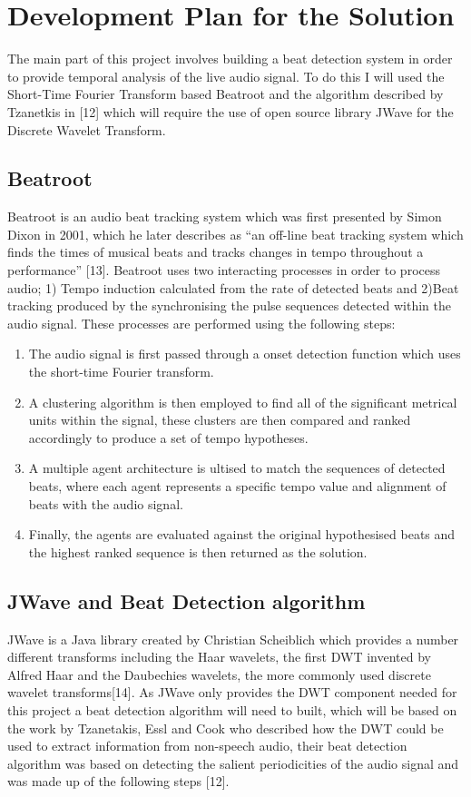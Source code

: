\documentclass[a4paper, 11pt]{article}
\begin{document}
\section{Development Plan for the Solution}

The main part of this project involves building a beat detection system in order to provide temporal analysis of the live audio signal. To do this I will used the Short-Time Fourier Transform based Beatroot and the algorithm described by Tzanetkis in [12] which will require the use of open source library JWave for the Discrete Wavelet Transform. 

\subsection{Beatroot}
Beatroot is an audio beat tracking system which was first presented by Simon Dixon in 2001, which he later describes as ``an off-line beat tracking system which finds the times of musical beats and tracks changes in tempo throughout a performance'' [13]. Beatroot uses two interacting processes in order to process audio; 1) Tempo induction calculated from the rate of detected beats and 2)Beat tracking produced by the synchronising the pulse sequences detected within the audio signal. These processes are performed using the following steps:

\begin{enumerate}
\item The audio signal is first passed through a onset detection function which uses the short-time Fourier transform. 
\item A clustering algorithm is then employed to find all of the significant metrical units within the signal, these clusters are then compared and ranked accordingly to produce a set of tempo hypotheses.
\item A multiple agent architecture is ultised to match the sequences of detected beats, where each agent represents a specific tempo value and alignment of beats with the audio signal.
\item Finally, the agents are evaluated against the original hypothesised beats and the highest ranked sequence is then returned as the solution.
\end{enumerate}

\subsection{JWave and Beat Detection algorithm}
JWave is a Java library created by Christian Scheiblich which provides a number different transforms including the Haar wavelets, the first DWT invented by Alfred Haar and the Daubechies wavelets, the more commonly used discrete wavelet transforms[14]. As JWave only provides the DWT component needed for this project a beat detection algorithm will need to built, which will be based on the work by Tzanetakis, Essl and Cook who described how the DWT could be used to extract information from non-speech audio, their beat detection algorithm was based on detecting the salient periodicities of the audio signal and was made up of the following steps [12]. 
\end{document}
